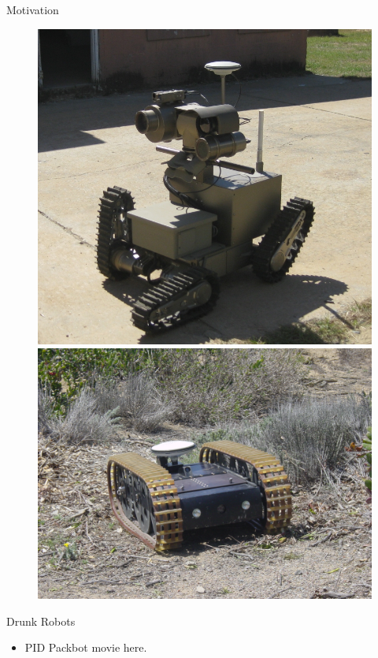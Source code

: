 \documentclass[hyperref={pdfpagelabels=false}]{beamer}
\begin{document}
\begin{frame}{Motivation}
\begin{figure}
{{            \includegraphics[height=.3\textheight]{images/chaos}
            \quad
            \includegraphics[height=.3\textheight]{images/urbotWithGps}
        } %
    } %
\end{figure}
\end{frame}

\begin{frame}{Drunk Robots}
\begin{itemize}
\item PID Packbot movie here.
\end{itemize}
\end{frame}
\end{document}
